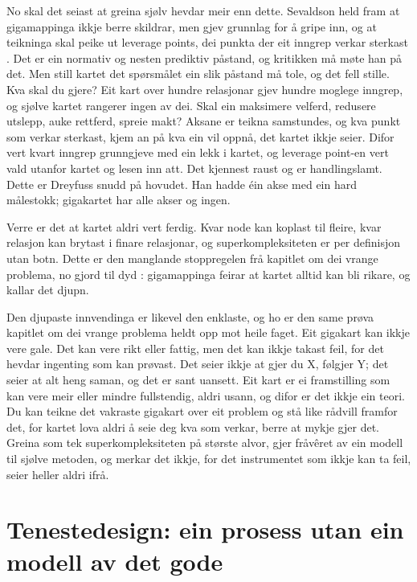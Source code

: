 No skal det seiast at greina sjølv hevdar meir enn dette. Sevaldson held fram at gigamappinga ikkje berre skildrar, men gjev grunnlag for å gripe inn, og at teikninga skal peike ut leverage points, dei punkta der eit inngrep verkar sterkast \autocite{sevaldson2022complexity}. Det er ein normativ og nesten prediktiv påstand, og kritikken må møte han på det. Men still kartet det spørsmålet ein slik påstand må tole, og det fell stille. Kva skal du gjere? Eit kart over hundre relasjonar gjev hundre moglege inngrep, og sjølve kartet rangerer ingen av dei. Skal ein maksimere velferd, redusere utslepp, auke rettferd, spreie makt? Aksane er teikna samstundes, og kva punkt som verkar sterkast, kjem an på kva ein vil oppnå, det kartet ikkje seier. Difor vert kvart inngrep grunngjeve med ein lekk i kartet, og leverage point-en vert vald utanfor kartet og lesen inn att. Det kjennest raust og er handlingslamt. Dette er Dreyfuss snudd på hovudet. Han hadde éin akse med ein hard målestokk; gigakartet har alle akser og ingen.

Verre er det at kartet aldri vert ferdig. Kvar node kan koplast til fleire, kvar relasjon kan brytast i finare relasjonar, og superkompleksiteten er per definisjon utan botn. Dette er den manglande stoppregelen frå kapitlet om dei vrange problema, no gjord til dyd \autocite{buchanan1992wicked}: gigamappinga feirar at kartet alltid kan bli rikare, og kallar det djupn.

Den djupaste innvendinga er likevel den enklaste, og ho er den same prøva kapitlet om dei vrange problema heldt opp mot heile faget. Eit gigakart kan ikkje vere gale. Det kan vere rikt eller fattig, men det kan ikkje takast feil, for det hevdar ingenting som kan prøvast. Det seier ikkje at gjer du X, følgjer Y; det seier at alt heng saman, og det er sant uansett. Eit kart er ei framstilling som kan vere meir eller mindre fullstendig, aldri usann, og difor er det ikkje ein teori. Du kan teikne det vakraste gigakart over eit problem og stå like rådvill framfor det, for kartet lova aldri å seie deg kva som verkar, berre at mykje gjer det. Greina som tek superkompleksiteten på største alvor, gjer fråvêret av ein modell til sjølve metoden, og merkar det ikkje, for det instrumentet som ikkje kan ta feil, seier heller aldri ifrå.

\section{Tenestedesign: ein prosess utan ein modell av det gode}

